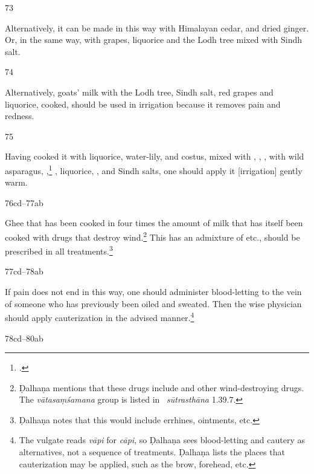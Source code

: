 \begin{translation}
    \item[73]
    
    Alternatively, it can be made in this way with Himalayan cedar,  and dried 
    ginger.
    Or, in the same way, with grapes, liquorice and the Lodh tree mixed with Sindh salt.
    
    \item[74]
    
    Alternatively, goats' milk with the Lodh tree, Sindh salt, red grapes and liquorice, cooked, 
    should be used in irrigation because it removes pain and redness. 
    
    \item[75]
    
    Having cooked it with liquorice, water-lily, and costus, mixed with ,
    ,
    , 
    with wild asparagus, ,\footcite[18]{suve-2000}
    ,
    liquorice,
    ,
    and Sindh salts, 
    one should apply it [irrigation] gently warm.
    
    
    \item[76cd--77ab]
    
    Ghee that has been cooked in four times the amount of milk that has itself
been cooked with drugs that destroy wind.\footnote{Ḍalhaṇa mentions that these
drugs include  and other wind-destroying drugs.  The
\emph{vātasaṃśamana} group is listed in \SS\ \emph{sūtrasthāna} 1.39.7.}
This has an admixture of  etc., should be
prescribed in all treatments.\footnote{Ḍalhaṇa notes that this would include
errhines, ointments, etc.}
    
    \item[77cd--78ab]
    
    If pain does not end in this way, one should administer blood-letting to the vein of 
    someone who has previously been oiled and sweated.  Then the wise physician should 
    apply cauterization in the advised manner.\footnote{The vulgate reads \emph{vāpi} for 
    \emph{cāpi}, so Ḍalhaṇa sees blood-letting and cautery as alternatives, not a sequence of 
    treatments.  Ḍalhaṇa lists the places that cauterization may be applied, such as  the brow, 
    forehead, etc.}
    
    \item[78cd--80ab]
    

\end{translation}
